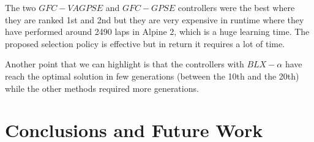 \documentclass[10pt,journal,compsoc]{IEEEtran}
\begin{document}
The two $GFC-VAGPSE$ and $GFC-GPSE$ controllers were the best where
they are ranked 1st and 2nd but they are very expensive in runtime
where they have performed around 2490 laps in Alpine 2, which is a
huge learning time. %
The proposed selection policy is effective but in return it requires a
lot of time. 

Another point that we can highlight is that the controllers with
$BLX-\alpha$ have reach the optimal solution in few generations
(between the 10th and the 20th) while the other methods required more
generations. 


\section{Conclusions and Future Work} 
\label{sec:conclusions}





\end{document}
